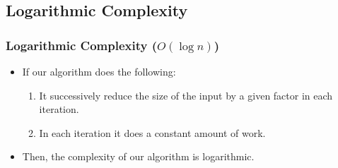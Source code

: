 \documentclass{beamer}
\begin{document}
\subsection{Logarithmic Complexity}

\begin{frame}%
\frametitle{Logarithmic Complexity ($O(\log n)$)}

\begin{itemize}

\item If our algorithm does the following:
\vspace{0.1cm}
\begin{enumerate}

\item<1-> It successively reduce the size of the input by a given factor in each iteration.

\vspace{0.1cm}

\item<2-> In each iteration it does a constant amount of work.

\end{enumerate}

\vspace{0.5cm}

\item<3-> Then, the complexity of our algorithm is logarithmic.

\end{itemize}

\end{frame}

\end{document}
